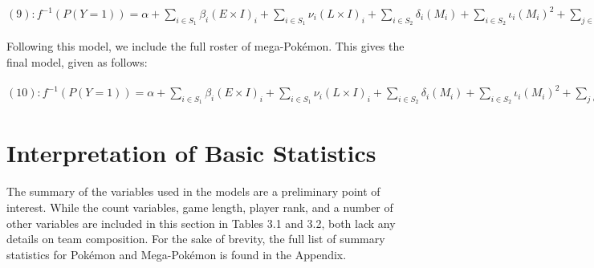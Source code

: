 \documentclass[12pt,twoside]{reedthesis}
\begin{document}
  \((9): f^{-1}(P(Y=1)) = \alpha+ \sum_{i \in S_1} \beta_i(E \times I)_i+ \sum_{i \in S_1} \nu_i(L \times I)_i+ \sum_{i \in S_2} \delta_i(M_i) + \sum_{i \in S_2} \iota_i(M_i)^2 + \sum_{j \in S_2}\theta_j((E \times I)_{SR} \times M_j) + \sum_{j \in S_2}\mu_j((L \times I)_{SR} \times M_j) + \sum_{j \in S_2} \lambda_j((E \times I)_{SR} \times (M_j)^2) + \sum_{j \in S_2} \epsilon_j((L \times I)_{SR} \times (M_j)^2) + \sum_{j \in S_1/SR} \chi_j((E \times I)_{SR} \times (E \times I)_j) + \sum_{j \in S_1/SR} \xi_j((E \times I)_{SR} \times (L \times I)_j) + \sum_{j \in S_1/SR} \psi_j((L \times I)_{SR} \times (E \times I)_j) + \sum_{j \in S_1/SR} \omega_j((L \times I)_{SR} \times (L \times I)_j) + \sum_{l \in P} \gamma_l(PU_l)\)
  
  Following this model, we include the full roster of mega-Pokémon. This
  gives the final model, given as follows:
  
  \((10): f^{-1}(P(Y=1)) = \alpha+ \sum_{i \in S_1} \beta_i(E \times I)_i+ \sum_{i \in S_1} \nu_i(L \times I)_i+ \sum_{i \in S_2} \delta_i(M_i) + \sum_{i \in S_2} \iota_i(M_i)^2 + \sum_{j \in S_2}\theta_j((E \times I)_{SR} \times M_j) + \sum_{j \in S_2}\mu_j((L \times I)_{SR} \times M_j) + \sum_{j \in S_2} \lambda_j((E \times I)_{SR} \times (M_j)^2) + \sum_{j \in S_2} \epsilon_j((L \times I)_{SR} \times (M_j)^2) + \sum_{j \in S_1/SR} \chi_j((E \times I)_{SR} \times (E \times I)_j) + \sum_{j \in S_1/SR} \xi_j((E \times I)_{SR} \times (L \times I)_j) + \sum_{j \in S_1/SR} \psi_j((L \times I)_{SR} \times (E \times I)_j) + \sum_{j \in S_1/SR} \omega_j((L \times I)_{SR} \times (L \times I)_j) + \sum_{l \in P} \gamma_l(PU_l) + \sum_{k \in G} \tau_k(GU_k)\)
  
  \section{Interpretation of Basic
  Statistics}\label{interpretation-of-basic-statistics}
  
  The summary of the variables used in the models are a preliminary point
  of interest. While the count variables, game length, player rank, and a
  number of other variables are included in this section in Tables 3.1 and
  3.2, both lack any details on team composition. For the sake of brevity,
  the full list of summary statistics for Pokémon and Mega-Pokémon is
  found in the Appendix.
  
\end{document}
